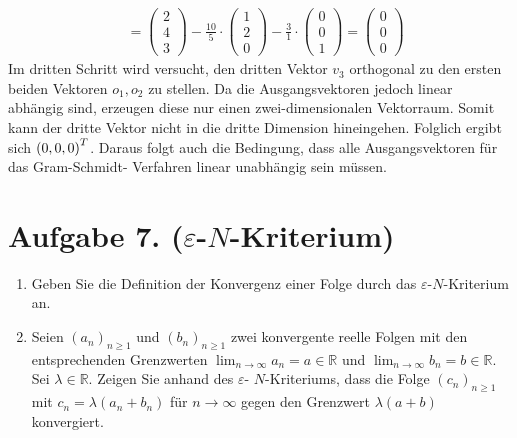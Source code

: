 \documentclass[german,12pt]{homework}
\DeclarePairedDelimiter{\enbrace}{(}{)}
\begin{document}
\begin{align*}
        &= \begin{pmatrix}2\\4\\3\end{pmatrix} - \frac{10}{5} \cdot
        \begin{pmatrix}1\\2\\0\end{pmatrix} - \frac{3}{1} \cdot
        \begin{pmatrix}0\\0\\1\end{pmatrix} =
        \begin{pmatrix}0\\0\\0\end{pmatrix}
    \end{align*}
    Im dritten Schritt wird versucht, den dritten Vektor \(v_3\) orthogonal zu
    den ersten beiden Vektoren \(o_1, o_2\) zu stellen. Da die Ausgangsvektoren
    jedoch linear abhängig sind, erzeugen diese nur einen zwei-dimensionalen
    Vektorraum. Somit kann der dritte Vektor nicht in die dritte Dimension
    hineingehen. Folglich ergibt sich \(\enbrace*{0, 0, 0}^T\). Daraus folgt
    auch die Bedingung, dass alle Ausgangsvektoren für das Gram-Schmidt-
    Verfahren linear unabhängig sein müssen.

    \section*{Aufgabe 7. (\(\varepsilon\)-\(N\)-Kriterium)}

    \begin{problem}
        \begin{enumerate}
            \item Geben Sie die Definition der Konvergenz einer Folge durch das
            \(\varepsilon\)-\(N\)-Kriterium an.
            \item Seien \(\left(a_n\right)_{n \ge 1}\) und
            \(\left(b_n\right)_{n \ge 1}\) zwei konvergente reelle Folgen mit
            den entsprechenden Grenzwerten \(\lim_{n \to \infty}a_n = a \in
            \mathbb{R}\) und \(\lim_{n \to \infty}b_n = b \in \mathbb{R}\). Sei
            \(\lambda \in \mathbb{R}\). Zeigen Sie anhand des \(\varepsilon\)-
            \(N\)-Kriteriums, dass die Folge \(\left(c_n\right)_{n \ge 1}\) mit
            \(c_n = \lambda\left(a_n + b_n\right)\) für \(n \to \infty\) gegen
            den Grenzwert \(\lambda\left(a + b\right)\) konvergiert.
        \end{enumerate}
    \end{problem}
\end{document}
